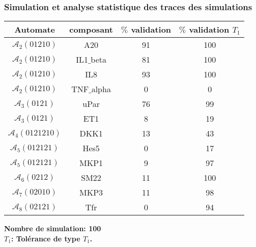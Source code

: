 
\begin{frame}
\frametitle{Simulation et analyse statistique des traces des simulations}
\begin{tabular}{|c|c||c|c|}
\hline

\textbf{Automate} & \textbf{composant} & \textbf{$\%$  validation} & \textbf{$\%$ validation $T_{1}$}
\\ \hline

$\mathcal{A}_{2}(01210)$ & A20 & 91 & 100 
\\ \hline

$\mathcal{A}_{2}(01210)$ & IL1$\_$beta & 81 & 100
\\ \hline

$\mathcal{A}_{2}(01210)$ & IL8 & 93 & 100 
\\ \hline

$\mathcal{A}_{2}(01210)$ & TNF$\_$alpha & 0 & 0
\\ \hline

$\mathcal{A}_{3}(0121)$ & uPar & 76 & 99 
\\ \hline

$\mathcal{A}_{3}(0121)$ & ET1 & 8 & 19 
\\ \hline

$\mathcal{A}_{4}(0121210)$ & DKK1 & 13 & 43

\\ \hline

$\mathcal{A}_{5}(012121)$ & Hes5 & 0 & 17 
\\ \hline

$\mathcal{A}_{5}(012121)$ & MKP1 & 9 & 97
\\ \hline

$\mathcal{A}_{6}(0212)$ & SM22 & 11 & 100 
\\ \hline

$\mathcal{A}_{7}(02010)$ & MKP3 & 11 & 98

\\ \hline

$\mathcal{A}_{8}(02121)$ & Tfr & 0 & 94 
\\ \hline

\end{tabular}

\medskip

\textbf{Nombre de simulation: 100}\\
\textbf{$T_1$: Tolérance de type $T_1$.}

\end{frame}



